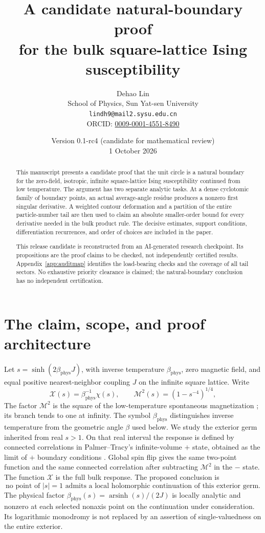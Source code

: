 \documentclass[11pt]{article}
\title{A candidate natural-boundary proof\\
for the bulk square-lattice Ising susceptibility}
\author{Dehao Lin\\
\small School of Physics, Sun Yat-sen University\\
\small\texttt{lindh9@mail2.sysu.edu.cn}\\
\small ORCID: \href{https://orcid.org/0009-0001-4551-8490}{0009-0001-4551-8490}}
\date{Version 0.1-rc4 (candidate for mathematical review)\\1 October 2026}
\numberwithin{equation}{section}
\theoremstyle{definition}
\newcommand{\M}{\mathcal M}
\begin{document}
\maketitle

\begin{abstract}
This manuscript presents a candidate proof that the unit circle is a
natural boundary for the zero-field, isotropic, infinite square-lattice
Ising susceptibility continued from low temperature. The argument has
two separate analytic tasks. At a dense cyclotomic family of boundary
points, an actual average-angle residue produces a nonzero first
singular derivative. A weighted contour deformation and a partition of
the entire particle-number tail are then used to claim an absolute
smaller-order bound for every derivative needed in the bulk product
rule. The decisive estimates, support conditions, differentiation
recurrences, and order of choices are included in the paper.

This release candidate is reconstructed from an AI-generated research checkpoint.
Its propositions are the proof claims to be checked, not independently
certified results. Appendix~\ref{app:auditmap} identifies the load-bearing
checks and the coverage of all tail sectors. No exhaustive priority
clearance is claimed; the natural-boundary conclusion has no
independent certification.
\end{abstract}

\section{The claim, scope, and proof architecture}\label{sec:scope}
Let \(s=\sinh(2\beta_{\mathrm{phys}} J)\), with inverse temperature
\(\beta_{\mathrm{phys}}\), zero magnetic field, and equal positive
nearest-neighbor coupling \(J\) on the infinite square lattice. Write
\[
 \mathcal X(s)=\beta_{\mathrm{phys}}^{-1}\chi(s),\qquad
 \M^2(s)=(1-s^{-4})^{1/4},
\]
The factor \(\M^2\) is the square of the low-temperature spontaneous
magnetization \cite{Yang1952}; its branch tends to one at infinity.
The symbol \(\beta_{\mathrm{phys}}\) distinguishes inverse temperature
from the geometric angle \(\beta\) used below. We study the exterior
germ inherited from real \(s>1\). On that real interval the response is
defined by connected correlations in Palmer--Tracy's infinite-volume
\(+\) state, obtained as the limit of \(+\) boundary conditions
\cite[pp.~332, 361]{PalmerTracy1981}. Global spin flip gives the same
two-point function and the same connected correlation after subtracting
\(\M^2\) in the \(-\) state. The function \(\mathcal X\) is the full
bulk response. The proposed conclusion is
\[
 \text{no point of }|s|=1\text{ admits a local holomorphic
 continuation of this exterior germ.}
\]
The physical factor \(\beta_{\mathrm{phys}}(s)=\operatorname{arsinh}(s)/(2J)\) is locally
analytic and nonzero at each selected nonaxis point on the continuation
under consideration. Its logarithmic monodromy is not replaced by an
assertion of single-valuedness on the entire exterior.
\end{document}
